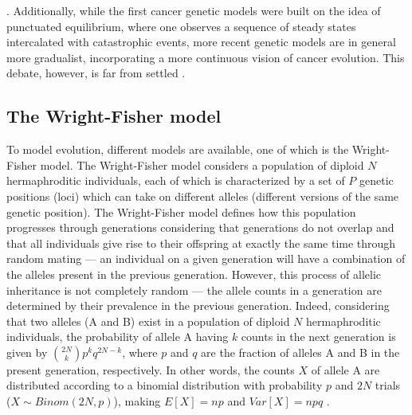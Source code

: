 \cite{Cannataro2018-ye,Schwartz2017-hg}. Additionally, while the first cancer genetic models were built on the idea of punctuated equilibrium, where one observes a sequence of steady states intercalated with catastrophic events, more recent genetic models are in general more gradualist, incorporating a more continuous vision of cancer evolution. This debate, however, is far from settled \cite{Beerenwinkel2015-xr,Sterelny2007-kp}. 

\subsection{The Wright-Fisher model}

To model evolution, different models are available, one of which is the Wright-Fisher model. The Wright-Fisher model considers a population of diploid $N$ hermaphroditic individuals, each of which is characterized by a set of $P$ genetic positions (loci) which can take on different alleles (different versions of the same genetic position). The Wright-Fisher model defines how this population progresses through generations considering that generations do not overlap and that all individuals give rise to their offspring at exactly the same time through random mating --- an individual on a given generation will have a combination of the alleles present in the previous generation. However, this process of allelic inheritance is not completely random --- the allele counts in a generation are determined by their prevalence in the previous generation. Indeed, considering that two alleles (A and B) exist in a population of diploid $N$ hermaphroditic individuals, the probability of allele A having $k$ counts in the next generation is given by $\binom{2N}{k}p^kq^{2N-k}$, where $p$ and $q$ are the fraction of alleles A and B in the present generation, respectively. In other words, the counts $X$ of allele A are distributed according to a binomial distribution with probability $p$ and $2N$ trials ($X \sim Binom(2N,p)$), making $E[X] = np$ and $Var[X] = npq$ \cite{Gillespie2004-xo}. 

